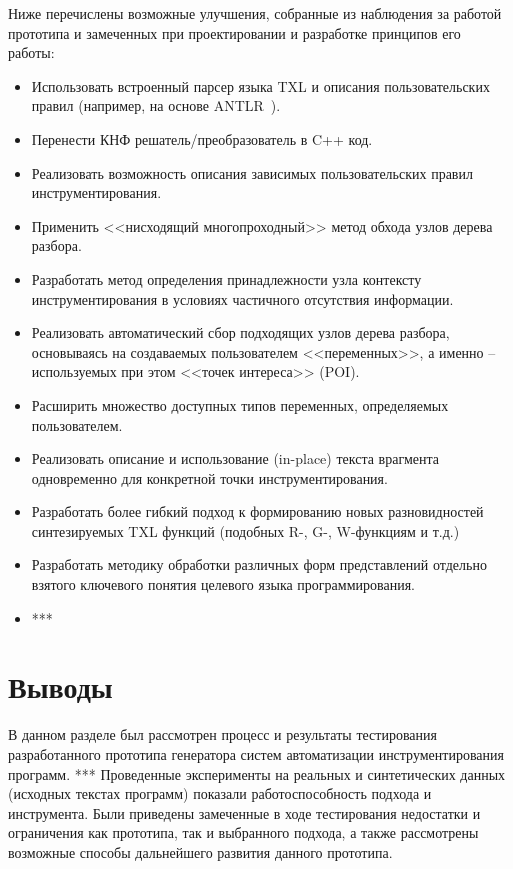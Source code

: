 Ниже перечислены возможные улучшения, собранные из наблюдения за работой прототипа и замеченных при проектировании и разработке принципов его работы:

\begin{itemize}[noitemsep]
  \item Использовать встроенный парсер языка TXL и описания пользовательских правил (например, на основе ANTLR~\cite{antlr}).
  \item Перенести КНФ решатель/преобразователь в C++ код.
  \item Реализовать возможность описания зависимых пользовательских правил инструментирования.
  \item Применить <<нисходящий многопроходный>> метод обхода узлов дерева разбора.
  \item Разработать метод определения принадлежности узла контексту инструментирования в условиях частичного отсутствия информации.
  \item Реализовать автоматический сбор подходящих узлов дерева разбора, основываясь на создаваемых пользователем <<переменных>>, а именно -- используемых при этом <<точек интереса>> (POI).
  \item Расширить множество доступных типов переменных, определяемых пользователем.
  \item Реализовать описание и использование (in-place) текста врагмента одновременно для конкретной точки инструментирования.
  \item Разработать более гибкий подход к формированию новых разновидностей синтезируемых TXL функций (подобных R-, G-, W-функциям и т.д.)
  \item Разработать методику обработки различных форм представлений отдельно взятого ключевого понятия целевого языка программирования.
  \item ***
\end{itemize}

\section{Выводы}

В данном разделе был рассмотрен процесс и результаты тестирования разработанного прототипа генератора систем автоматизации инструментирования программ.
***
Проведенные эксперименты на реальных и синтетических данных (исходных текстах программ) показали работоспособность подхода и инструмента.
Были приведены замеченные в ходе тестирования недостатки и ограничения как прототипа, так и выбранного подхода, а также рассмотрены возможные способы дальнейшего развития данного прототипа.


